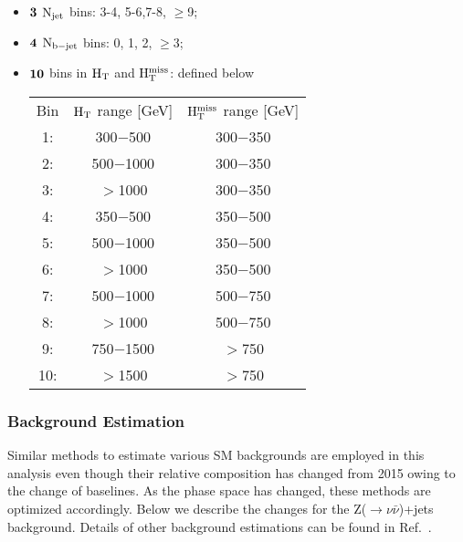 \begin{itemize}

 \item ${\bf 3 }$ $\rm N_{jet}$ bins: 3-4, 5-6,7-8, $\geq$9;
 \item ${\bf 4 }$ $\rm N_{b-jet}$ bins: 0, 1, 2, $\geq$3;
 \item  ${\bf 10 }$ bins in $\rm H_{T}$ and $\rm H_{T}^{miss}$: defined below



\begin{center}
\begin{tabular}{ c c c }
 Bin & $\rm H_{T}$ range [GeV] & $\rm H_{T}^{miss}$ range [GeV] \\ 
  1: & 300$-$500 & 300$-$350 \\ 

  2: & 500$-$1000 & 300$-$350 \\  

  3: & $>$1000 & 300$-$350\\

  4:&  350$-$500 & 350$-$500\\

  5: & 500$-$1000 & 350$-$500\\

  6: & $>$1000 & 350$-$500\\

  7: & 500$-$1000 & 500$-$750\\

  8: & $>$1000 & 500$-$750\\

  9: & 750$-$1500 & $>$750\\

 10: & $>$1500 & $>$750\\


\end{tabular}
\end{center}


 
\end{itemize}


\subsubsection{Background Estimation}
Similar methods to estimate various SM backgrounds are employed in this analysis even though their relative composition has changed from 2015 owing to the change of baselines. As the phase space has changed, these methods are optimized accordingly. Below we describe the changes for the Z($\rightarrow \nu \bar{\nu}$)+jets background. Details of other background estimations can be found in Ref.~\cite{CMS-PAS-SUS-16-014}.

